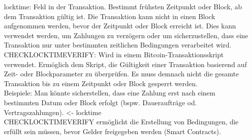 \documentclass[german]{../uebung}
\begin{document}
\begin{exercise}{6}
    locktime: Feld in der Transaktion. Bestimmt frühsten Zeitpunkt oder Block, ab dem Transaktion gültig ist. Die Transaktion kann nicht in einen Block aufgenommen werden, bevor der Zeitpunkt oder Block erreicht ist. Dies kann verwendet werden, um Zahlungen zu verzögern oder um sicherzustellen, dass eine Transaktion nur unter bestimmten zeitlichen Bedingungen verarbeitet wird.\\
    CHECKLOCKTIMEVERIFY: Wird in einem Bitcoin-Transaktionsskript verwendet. Ermöglich dem Skript, die Gültigkeit einer Transaktion basierend auf Zeit- oder Blockparameter zu überprüfen. Es muss demnach nicht die gesamte Transaktion bis zu einem Zeitpunkt oder Block gesperrt werden.\\
    Beispiele: Man könnte sicherstellen, dass eine Zahlung erst nach einem bestimmten Datum oder Block erfolgt (bspw. Daueraufträge od. Vertragszahlungen). <- locktime\\
    CHECKLOCKTIMEVERIFY ermöglicht die Erstellung von Bedingungen, die erfüllt sein müssen, bevor Gelder freigegeben werden (Smart Contracts).
\end{exercise}
\end{document}
